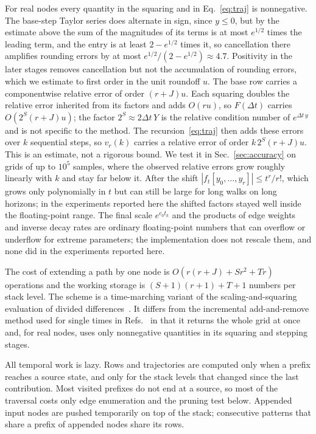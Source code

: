 \documentclass[aps,pra,superscriptaddress,floatfix,longbibliography,twocolumn]{revtex4-2}
\begin{document}
For real nodes every quantity in the squaring and in Eq.~\eqref{eq:traj} is nonnegative. The base-step Taylor series does alternate in sign, since $y\le0$, but by the estimate above the sum of the magnitudes of its terms is at most $e^{1/2}$ times the leading term, and the entry is at least $2-e^{1/2}$ times it, so cancellation there amplifies rounding errors by at most $e^{1/2}/(2-e^{1/2})\approx4.7$. Positivity in the later stages removes cancellation but not the accumulation of rounding errors, which we estimate to first order in the unit roundoff $u$. The base row carries a componentwise relative error of order $(r+J)u$. Each squaring doubles the relative error inherited from its factors and adds $O(ru)$, so $F(\Delta t)$ carries $O(2^S(r+J)u)$; the factor $2^S\approx2\Delta t\,Y$ is the relative condition number of $e^{\Delta t\,y}$ and is not specific to the method. The recursion~\eqref{eq:traj} then adds these errors over $k$ sequential steps, so $v_r(k)$ carries a relative error of order $k\,2^S(r+J)u$. This is an estimate, not a rigorous bound. We test it in Sec.~\ref{sec:accuracy} on grids of up to $10^5$ samples, where the observed relative errors grow roughly linearly with $k$ and stay far below it. After the shift $|f_{t}[y_0,\dots,y_r]|\le t^r/r!$, which grows only polynomially in $t$ but can still be large for long walks on long horizons; in the experiments reported here the shifted factors stayed well inside the floating-point range. The final scale $e^{c_0t_k}$ and the products of edge weights and inverse decay rates are ordinary floating-point numbers that can overflow or underflow for extreme parameters; the implementation does not rescale them, and none did in the experiments reported here.

The cost of extending a path by one node is $O(r(r+J)+Sr^2+Tr)$ operations and the working storage is $(S+1)(r+1)+T+1$ numbers per stack level. The scheme is a time-marching variant of the scaling-and-squaring evaluation of divided differences~\cite{mccurdy1984,caliari2007,zivcovich2019}. It differs from the incremental add-and-remove method used for single times in Refs.~\cite{gupta2020dd,barash2022} in that it returns the whole grid at once and, for real nodes, uses only nonnegative quantities in its squaring and stepping stages.

All temporal work is lazy. Rows and trajectories are computed only when a prefix reaches a source state, and only for the stack levels that changed since the last contribution. Most visited prefixes do not end at a source, so most of the traversal costs only edge enumeration and the pruning test below. Appended input nodes are pushed temporarily on top of the stack; consecutive patterns that share a prefix of appended nodes share its rows.
\end{document}
